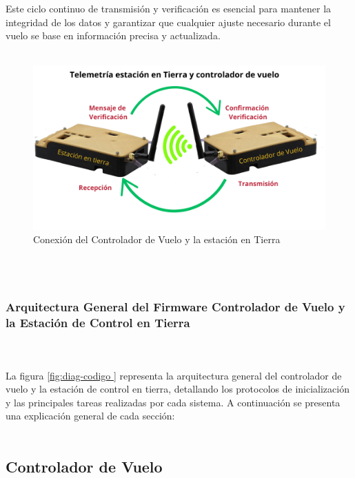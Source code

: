Este ciclo continuo de transmisión y verificación es esencial para mantener la integridad de los datos y garantizar que cualquier ajuste necesario durante el vuelo se base en información precisa y actualizada.\\ \\ 
\begin{figure}[H]
    \centering
    \includegraphics[width=\textwidth]{Imagenes/Metodologia/estacion en tierra.png}
    \caption{Conexión del Controlador de Vuelo y la estación en Tierra}
    \label{fig:estacion en tierra}
\end{figure} \\ \\ 



\subsubsection{Arquitectura General del Firmware Controlador de Vuelo y la Estación de Control en Tierra} \\  \\ 


La figura \ref{fig:diag-codigo } representa la arquitectura general del controlador de vuelo y la estación de control en tierra, detallando los protocolos de inicialización y las principales tareas realizadas por cada sistema. A continuación se presenta una explicación general de cada sección:\\ \\ 

\subsection{Controlador de Vuelo}\\  \\ 

